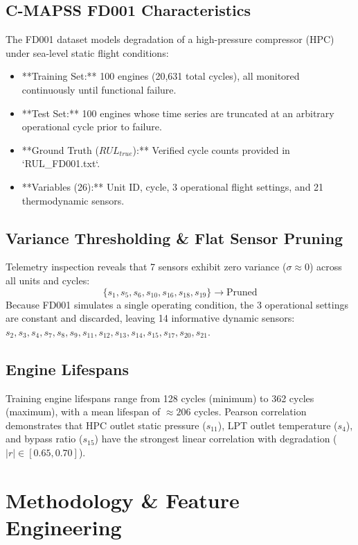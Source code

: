 \documentclass[conference]{IEEEtran}
\begin{document}
\subsection{C-MAPSS FD001 Characteristics}
The FD001 dataset models degradation of a high-pressure compressor (HPC) under sea-level static flight conditions:
\begin{itemize}
    \item **Training Set:** 100 engines (20,631 total cycles), all monitored continuously until functional failure.
    \item **Test Set:** 100 engines whose time series are truncated at an arbitrary operational cycle prior to failure.
    \item **Ground Truth ($RUL_{true}$):** Verified cycle counts provided in `RUL\_FD001.txt`.
    \item **Variables (26):** Unit ID, cycle, 3 operational flight settings, and 21 thermodynamic sensors.
\end{itemize}

\subsection{Variance Thresholding \& Flat Sensor Pruning}
Telemetry inspection reveals that 7 sensors exhibit zero variance ($\sigma \approx 0$) across all units and cycles:
\begin{equation}
\{s_1, s_5, s_6, s_{10}, s_{16}, s_{18}, s_{19}\} \rightarrow \text{Pruned}
\end{equation}
Because FD001 simulates a single operating condition, the 3 operational settings are constant and discarded, leaving 14 informative dynamic sensors: $s_2, s_3, s_4, s_7, s_8, s_9, s_{11}, s_{12}, s_{13}, s_{14}, s_{15}, s_{17}, s_{20}, s_{21}$.

\subsection{Engine Lifespans}
Training engine lifespans range from 128 cycles (minimum) to 362 cycles (maximum), with a mean lifespan of $\approx 206$ cycles. Pearson correlation demonstrates that HPC outlet static pressure ($s_{11}$), LPT outlet temperature ($s_4$), and bypass ratio ($s_{15}$) have the strongest linear correlation with degradation ($|r| \in [0.65, 0.70]$).

\section{Methodology \& Feature Engineering}
\end{document}
